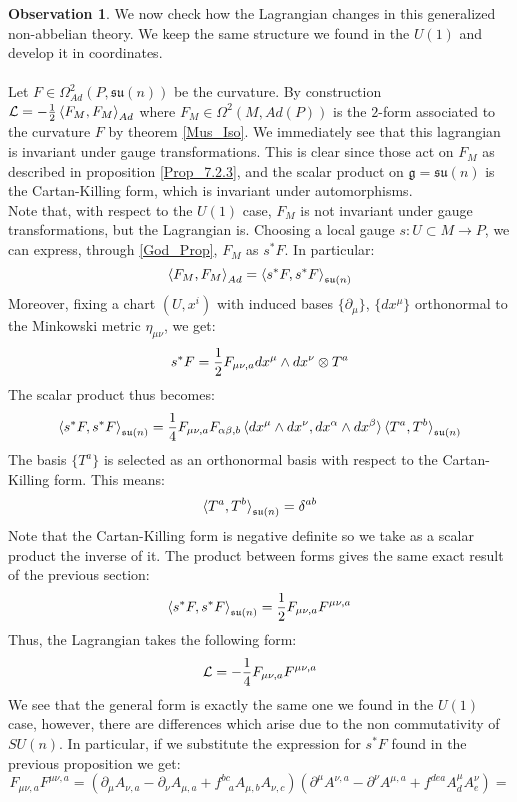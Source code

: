 \documentclass[12pt,a4paper]{report}
\theoremstyle{definition}
\theoremstyle{Theorem}
\theoremstyle{definition}
\theoremstyle{definition}
\newtheorem{Obs}[Def]{Observation}
\begin{document}
	\begin{Obs}
		We now check how the Lagrangian changes in this generalized non-abbelian theory. We keep the same structure we found in the $U(1)$ and develop it in coordinates.\\
		\\
		Let $F\in\Omega^2_{Ad}(P,\mathfrak{su}(n))$ be the curvature. By construction $\mathcal{L}=-{1\over 2}\braket{F_M,F_M}_{Ad}$ where $F_M\in \Omega^2(M,Ad(P))$ is the $2$-form associated to the curvature $F$ by theorem \ref{Mus_Iso}. We immediately see that this lagrangian is invariant under gauge transformations. This is clear since those act on $F_M$ as described in proposition \ref{Prop_7.2.3}, and the scalar product on $\mathfrak{g}=\mathfrak{su}(n)$ is the Cartan-Killing form, which is invariant under automorphisms.\\
		Note that, with respect to the $U(1)$ case, $F_M$ is not invariant under gauge transformations, but the Lagrangian is. Choosing a local gauge $s:U\subset M\rightarrow P$, we can express, through \ref{God_Prop}, $F_M$ as $s^*F$. In particular:
		$$\braket{F_M,F_M}_{Ad}=\braket{s^*F,s^*F}_{\mathfrak{su}(n)}$$
		Moreover, fixing a chart $(U,x^i)$ with induced bases $\{\partial_\mu\}$, $\{dx^\mu\}$ orthonormal to the Minkowski metric $\eta_{\mu\nu}$, we get:
		$$s^*F={1\over 2}F_{\mu\nu,a}dx^\mu\wedge dx^\nu\otimes T^a$$
		The scalar product thus becomes:
		$$\braket{s^*F,s^*F}_{\mathfrak{su}(n)}={1\over 4}F_{\mu\nu,a}F_{\alpha\beta,b}\braket{dx^\mu\wedge dx^\nu,dx^\alpha\wedge dx^\beta}\braket{T^a,T^b}_{\mathfrak{su}(n)}$$
		The basis $\{T^a\}$ is selected as an orthonormal basis with respect to the Cartan-Killing form. This means:
		$$\braket{T^a,T^b}_{\mathfrak{su}(n)}=\delta^{ab}$$
		Note that the Cartan-Killing form is negative definite so we take as a scalar product the inverse of it. The product between forms gives the same exact result of the previous section:
		$$\braket{s^*F,s^*F}_{\mathfrak{su}(n)}={1\over 2}F_{\mu\nu,a}F^{\mu\nu,a}$$
		Thus, the Lagrangian takes the following form:
		$$\mathcal{L}=-{1\over 4}F_{\mu\nu,a}F^{\mu\nu,a}$$
		We see that the general form is exactly the same one we found in the $U(1)$ case, however, there are differences which arise due to the non commutativity of $SU(n)$. In particular, if we substitute the expression for $s^*F$ found in the previous proposition we get:
		$$F_{\mu\nu,a}F^{\mu\nu,a}=(\partial_\mu A_{\nu,a}-\partial_\nu A_{\mu,a}+f^{bc}_{\hspace{9pt}a}A_{\mu,b}A_{\nu,c})(\partial^\mu A^{\nu,a}-\partial^\nu A^{\mu,a}+f^{dea}A^{\mu}_dA^{\nu}_e)=$$

\end{Obs}
\end{document}
